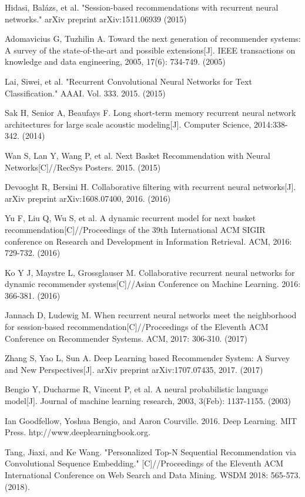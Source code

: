\documentclass[runningheads]{llncs}
\begin{document}
\begin{thebibliography}{8}
 Hidasi, Balázs, et al. "Session-based recommendations with recurrent neural networks." arXiv preprint arXiv:1511.06939 (2015)

 Adomavicius G, Tuzhilin A. Toward the next generation of recommender systems: A survey of the state-of-the-art and possible extensions[J]. IEEE transactions on knowledge and data engineering, 2005, 17(6): 734-749. (2005)

 Lai, Siwei, et al. "Recurrent Convolutional Neural Networks for Text Classification." AAAI. Vol. 333. 2015. (2015)

 Sak H, Senior A, Beaufays F. Long short-term memory recurrent neural network architectures for large scale acoustic modeling[J]. Computer Science, 2014:338-342. (2014)

 Wan S, Lan Y, Wang P, et al. Next Basket Recommendation with Neural Networks[C]//RecSys Posters. 2015. (2015)

 Devooght R, Bersini H. Collaborative filtering with recurrent neural networks[J]. arXiv preprint arXiv:1608.07400, 2016. (2016)

 Yu F, Liu Q, Wu S, et al. A dynamic recurrent model for next basket recommendation[C]//Proceedings of the 39th International ACM SIGIR conference on Research and Development in Information Retrieval. ACM, 2016: 729-732. (2016)

 Ko Y J, Maystre L, Grossglauser M. Collaborative recurrent neural networks for dynamic recommender systems[C]//Asian Conference on Machine Learning. 2016: 366-381. (2016)

 Jannach D, Ludewig M. When recurrent neural networks meet the neighborhood for session-based recommendation[C]//Proceedings of the Eleventh ACM Conference on Recommender Systems. ACM, 2017: 306-310. (2017)

 Zhang S, Yao L, Sun A. Deep Learning based Recommender System: A Survey and New Perspectives[J]. arXiv preprint arXiv:1707.07435, 2017. (2017)

 Bengio Y, Ducharme R, Vincent P, et al. A neural probabilistic language model[J]. Journal of machine learning research, 2003, 3(Feb): 1137-1155. (2003)

 Ian Goodfellow, Yoshua Bengio, and Aaron Courville. 2016. Deep Learning. MIT Press. htp://www.deeplearningbook.org.

 Tang, Jiaxi, and Ke Wang. "Personalized Top-N Sequential Recommendation via Convolutional Sequence Embedding." [C]//Proceedings of the Eleventh ACM International Conference on Web Search and Data Mining. WSDM 2018: 565-573. (2018).
\end{thebibliography}
\end{document}
